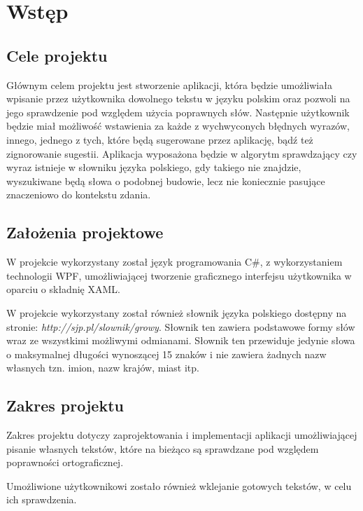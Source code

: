 \chapter{Wstęp}

\section{Cele projektu}

Głównym celem projektu jest stworzenie aplikacji, która będzie umożliwiała wpisanie przez użytkownika dowolnego tekstu w języku polskim oraz pozwoli na jego sprawdzenie pod względem użycia poprawnych słów. Następnie użytkownik będzie miał możliwość wstawienia za każde z wychwyconych błędnych wyrazów, innego, jednego z tych, które będą sugerowane przez aplikację, bądź też zignorowanie sugestii. Aplikacja wyposażona będzie w algorytm sprawdzający czy wyraz istnieje w słowniku języka polskiego, gdy takiego nie znajdzie, wyszukiwane będą słowa o podobnej budowie, lecz nie koniecznie pasujące znaczeniowo do kontekstu zdania.

\section{Założenia projektowe}

W projekcie wykorzystany został język programowania C\#, z wykorzystaniem technologii WPF, umożliwiającej tworzenie graficznego interfejsu użytkownika w oparciu o składnię XAML.

W projekcie wykorzystany został również słownik języka polskiego dostępny na stronie: \textit{http://sjp.pl/slownik/growy}. Słownik ten zawiera podstawowe formy słów wraz ze wszystkimi możliwymi odmianami. Słownik ten przewiduje jedynie słowa o maksymalnej długości wynoszącej 15 znaków i nie zawiera żadnych nazw własnych tzn. imion, nazw krajów, miast itp.

\section{Zakres projektu}
Zakres projektu dotyczy zaprojektowania i implementacji aplikacji umożliwiającej pisanie własnych tekstów, które na bieżąco są sprawdzane pod względem poprawności ortograficznej.

Umożliwione użytkownikowi zostało również wklejanie gotowych tekstów, w celu ich sprawdzenia.




